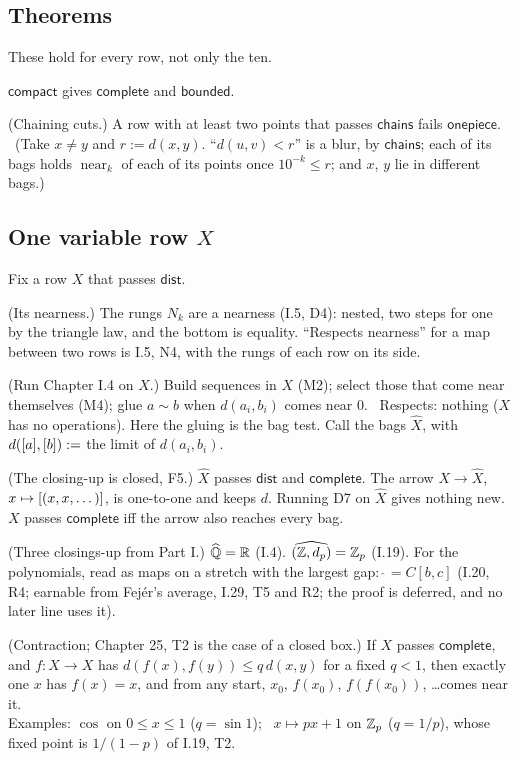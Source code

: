 \subsection*{Theorems}

These hold for every row, not only the ten.
\begin{lines}
\item[\lab{T1}] $\mathsf{compact}$ gives $\mathsf{complete}$ and $\mathsf{bounded}$.
\item[\lab{T2}] (Chaining cuts.) A row with at least two points that passes $\mathsf{chains}$ fails $\mathsf{onepiece}$. \ (Take $x \neq y$ and $r := d(x, y)$. ``$d(u, v) < r$'' is a blur, by $\mathsf{chains}$; each of its bags holds $\operatorname{near}_k$ of each of its points once $10^{-k} \le r$; and $x$, $y$ lie in different bags.)
\end{lines}

\subsection*{One variable row $X$}

Fix a row $X$ that passes $\mathsf{dist}$.
\begin{lines}
\item[\lab{P5}] (Its nearness.) The rungs $N_k$ are a nearness (I.5, D4): nested, two steps for one by the triangle law, and the bottom is equality. ``Respects nearness'' for a map between two rows is I.5, N4, with the rungs of each row on its side.
\item[\lab{D7}] (Run Chapter I.4 on $X$.) Build sequences in $X$ (M2); select those that come near themselves (M4); glue $a \sim b$ when $d(a_i, b_i)$ comes near $0$. \ Respects: nothing ($X$ has no operations). Here the gluing is the bag test. Call the bags $\widehat X$, with $d([a], [b]) :=$ the limit of $d(a_i, b_i)$.
\item[\lab{T3}] (The closing-up is closed, F5.) $\widehat X$ passes $\mathsf{dist}$ and $\mathsf{complete}$. The arrow $X \to \widehat X$, $x \mapsto [(x, x, \dots)]$, is one-to-one and keeps $d$. Running D7 on $\widehat X$ gives nothing new. $X$ passes $\mathsf{complete}$ iff the arrow also reaches every bag.
\item[\lab{T4}] (Three closings-up from Part I.) $\widehat{\mathbb{Q}} = \mathbb{R}$ (I.4). $\widehat{(\mathbb{Z}, d_p)} = \mathbb{Z}_p$ (I.19). For the polynomials, read as maps on a stretch with the largest gap: $\widehat{\ } = C[b,c]$ (I.20, R4; earnable from Fejér's average, I.29, T5 and R2; the proof is deferred, and no later line uses it).
\item[\lab{T5}] (Contraction; Chapter 25, T2 is the case of a closed box.) If $X$ passes $\mathsf{complete}$, and $f : X \to X$ has $d(f(x), f(y)) \le q\, d(x, y)$ for a fixed $q < 1$, then exactly one $x$ has $f(x) = x$, and from any start, $x_0$, $f(x_0)$, $f(f(x_0))$, \dots comes near it. \\
Examples: $\cos$ on $0 \le x \le 1$ ($q = \sin 1$); \ $x \mapsto p x + 1$ on $\mathbb{Z}_p$ ($q = 1/p$), whose fixed point is $1/(1 - p)$ of I.19, T2.
\end{lines}


